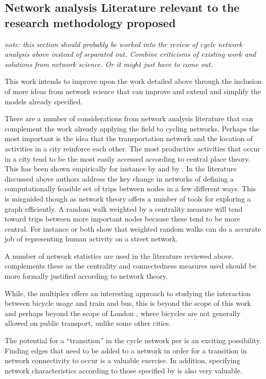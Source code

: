 \documentclass[11pt]{article} %
\begin{document}
\subsection{Network analysis Literature relevant to the research methodology proposed}

\textit{note: this section should probably be worked into the review of cycle network analysis above instead of separated out. Combine criticisms of existing work and solutions from network science. Or it might just have to come out.}

This work intends to improve upon the work detailed above through the inclusion of more ideas from network science that can improve and extend and simplify the models already specified. 

There are a number of considerations from network analysis literature that can complement the work already applying the field to cycling networks. Perhaps the most important is the idea that the transportation network and the location of activities in a city reinforce each other. The most productive activities that occur in a city tend to be the most easily accessed according to central place theory. This has been shown empirically for instance by \cite{porta2012street} and by \cite{wang2011street}. In the literature discussed above authors address the key change in networks of defining a computationally feasible set of trips between nodes in a few different ways. This is misguided though as network theory offers a number of tools for exploring a graph efficiently. A random walk weighted by a centrality measure will tend toward trips between more important nodes because these tend to be more central. For instance \cite{Jiang2009characterizing} or  \cite{volchenkov2007random} both show that weighted random walks can do a accurate job of representing human activity on a street network. 

A number of network statistics are used in the literature reviewed above. \cite{crucitti2006centrality} complements these as the centrality and connectedness measures used should be more formally justified according to network theory. 

While, the multiplex offers an interesting approach to studying the interaction between bicycle usage and train and bus, this is beyond the scope of this work and perhaps beyond the scope of London , where bicycles are not generally allowed on public transport, unlike some other cities. 

The potential for a ``transition'' in the cycle network per \cite{barthelemy2018transitions} is an exciting possibility. Finding edges that need to be added to a network in order for a transition in network connectivity to occur is a valuable exercise. In addition, specifying network characteristics according to those specified by \cite{barthelemy2011spatial} is also very valuable. 
\end{document}
